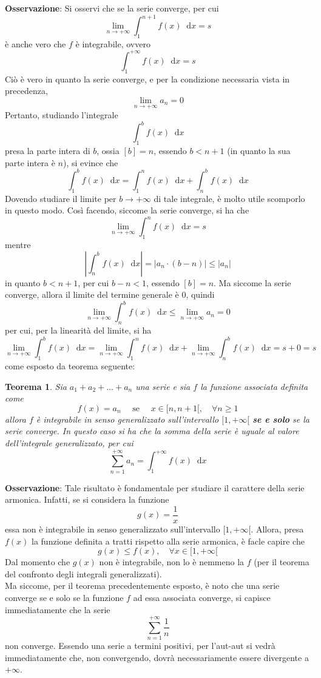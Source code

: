 \documentclass[a4paper]{extarticle}
\newtheorem{theorem}{Teorema}[section]
\newcommand*\dif{\mathop{}\!\mathrm{d}}
\begin{document}
\vspace{1em}
\noindent
\textbf{Osservazione}: Si osservi che se la serie converge, per cui
\[\lim_{n \to +\infty} \int_1^{n+1} f(x) \dif x = s\]
è anche vero che $f$ è integrabile, ovvero
\[\int_1^{+\infty} f(x) \dif x = s\]
Ciò è vero in quanto la serie converge, e per la condizione necessaria vista in precedenza,
\[\lim_{n \to +\infty} a_n = 0\]
Pertanto, studiando l'integrale
\[\int_1^b f(x) \dif x\]
presa la parte intera di $b$, ossia $[b]=n$, essendo $b < n+1$ (in quanto la sua parte intera è $n$), si evince che 
\[\int_1^b f(x) \dif x = \int_1^n f(x) \dif x + \int_n^b f(x) \dif x\]
Dovendo studiare il limite per $b \to + \infty$ di tale integrale, è molto utile scomporlo in questo modo. Così facendo, siccome la serie converge, si ha che
\[\lim_{n \to +\infty} \int_1^n f(x) \dif x = s\]
mentre
\[\left \vert \int_n^b f(x) \dif x \right \vert = \left \vert a_n \cdot (b-n) \right \vert \leq \left \vert a_n \right \vert\]
in quanto $b<n+1$, per cui $b-n<1$, essendo $[b]=n$. Ma siccome la serie converge, allora il limite del termine generale è $0$, quindi
\[\lim_{n \to +\infty} \int_n^b f(x) \dif x \leq \lim_{n \to +\infty} a_n = 0\]
per cui, per la linearità del limite, si ha
\[\lim_{n \to +\infty} \int_1^b f(x) \dif x = \lim_{n \to +\infty} \int_1^n f(x) \dif x + \lim_{n \to +\infty} \int_n^b f(x) \dif x = s+0=s\]
come esposto da teorema seguente:

\vspace{2em}
\noindent
\begin{theorem}
    Sia $a_1+a_2+\dots+a_n$ una serie e sia $f$ la funzione associata definita come
    \[f(x)=a_n \hspace{1em} \text{ se } \hspace{1em} x \in [n,n+1[, \hspace{1em} \forall n \geq 1\]
    allora $f$ è integrabile in senso generalizzato sull'intervallo $[1,+\infty[$ \textbf{se e solo} se la serie converge. In questo caso si ha che la somma della serie è uguale al valore dell'integrale generalizzato, per cui
    \[\sum_{n=1}^{+\infty} a_n = \int_1^{+\infty} f(x) \dif x\]
\end{theorem}

\vspace{1em}
\noindent
\textbf{Osservazione}: Tale risultato è fondamentale per studiare il carattere della serie armonica. Infatti, se si considera la funzione
\[g(x)=\frac{1}{x}\]
essa non è integrabile in senso generalizzato sull'intervallo $[1,+\infty[$. Allora, presa $f(x)$ la funzione definita a tratti rispetto alla serie armonica, è facle capire che
\[g(x) \leq f(x), \hspace{1em} \forall x \in [1,+\infty[\]
Dal momento che $g(x)$ non è integrabile, non lo è nemmeno la $f$ (per il teorema del confronto degli integrali generalizzati).\\
Ma siccome, per il teorema precedentemente esposto, è noto che una serie converge se e solo se la funzione $f$ ad essa associata converge, si capisce immediatamente che la serie
\[\sum_{n=1}^{+\infty} \frac{1}{n}\]
non converge. Essendo una serie a termini positivi, per l'aut-aut si vedrà immediatamente che, non convergendo, dovrà necessariamente essere divergente a $+\infty$.
\end{document}
